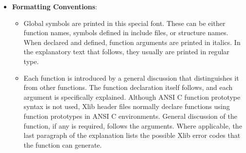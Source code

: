 \documentclass{report}
\begin{document}
\begin{itemize}
\begin{itemize}
                    \begin{itemize}
                        \item \textbf{Latin-1}: The coded character set defined by the ISO8859-1 standard.
                        \item \textbf{Latin Portable Character Encoding}: The encoding of the X Portable Character Set using the Latin-1 codepoints plus ASCII control characters. If a string is said to be in the Latin Portable Character Encoding, then it only contains characters from the X Portable Character Set, not all of Latin-1.
                        \item \textbf{STRING Encoding}: Latin-1, plus tab and newline.
                        \item \textbf{POSIX Portable Filename Character Set}: The set of 65 characters, which can be used in naming files on a POSIX-compliant host, that are correctly processed in all locales. The set is:
                            \begin{align*}
                                a..z \hspace{1em} A..Z \hspace{1em} 0..9 \hspace{1em} .\_-
                            .\end{align*}
                    \end{itemize}
            \end{itemize}
        \item \textbf{Formatting Conventions}: 
            \begin{itemize}
                \item Global symbols are printed in this special font. These can be either function names, symbols defined in include files, or structure names. When declared and defined, function arguments are printed in italics. In the explanatory text that follows, they usually are printed in regular type.
                \item Each function is introduced by a general discussion that distinguishes it from other functions. The function declaration itself follows, and each argument is specifically explained. Although ANSI C function prototype syntax is not used, Xlib header files normally declare functions using function prototypes in ANSI C environments. General discussion of the function, if any is required, follows the arguments. Where applicable, the last paragraph of the explanation lists the possible Xlib error codes that the function can generate. 

\end{itemize}
\end{itemize}
\end{document}
